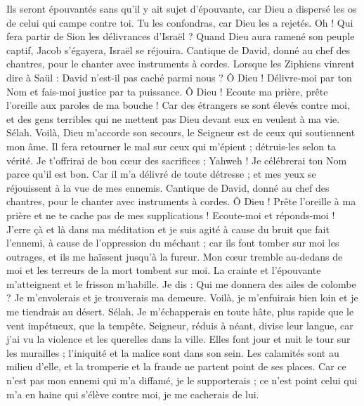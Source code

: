 \begin{multicols}{2}
Ils seront épouvantés sans qu'il y ait sujet d'épouvante, car Dieu a dispersé les os de celui qui campe contre toi. Tu les confondras, car Dieu les a rejetés.
Oh ! Qui fera partir de Sion les délivrances d'Israël ? Quand Dieu aura ramené son peuple captif, Jacob s'égayera, Israël se réjouira.
\VerseOne{}Cantique de David, donné au chef des chantres, pour le chanter avec instruments à cordes.
Lorsque les Ziphiens vinrent dire à Saül : David n'est-il pas caché parmi nous ?
Ô Dieu ! Délivre-moi par ton Nom et fais-moi justice par ta puissance.
Ô Dieu ! Ecoute ma prière, prête l'oreille aux paroles de ma bouche !
Car des étrangers se sont élevés contre moi, et des gens terribles qui ne mettent pas Dieu devant eux en veulent à ma vie. Sélah.
Voilà, Dieu m'accorde son secours, le Seigneur est de ceux qui soutiennent mon âme.
Il fera retourner le mal sur ceux qui m'épient ; détruis-les selon ta vérité.
Je t'offrirai de bon cœur des sacrifices ; Yahweh ! Je célébrerai ton Nom parce qu'il est bon.
Car il m'a délivré de toute détresse ; et mes yeux se réjouissent à la vue de mes ennemis.
\VerseOne{}Cantique de David, donné au chef des chantres, pour le chanter avec instruments à cordes.
Ô Dieu ! Prête l'oreille à ma prière et ne te cache pas de mes supplications !
Ecoute-moi et réponds-moi ! J'erre çà et là dans ma méditation et je suis agité
à cause du bruit que fait l'ennemi, à cause de l'oppression du méchant ; car ils font tomber sur moi les outrages, et ils me haïssent jusqu'à la fureur.
Mon cœur tremble au-dedans de moi et les terreurs de la mort tombent sur moi.
La crainte et l'épouvante m'atteignent et le frisson m'habille.
Je dis : Qui me donnera des ailes de colombe ? Je m'envolerais et je trouverais ma demeure.
Voilà, je m'enfuirais bien loin et je me tiendrais au désert. Sélah.
Je m'échapperais en toute hâte, plus rapide que le vent impétueux, que la tempête.
Seigneur, réduis à néant, divise leur langue, car j'ai vu la violence et les querelles dans la ville.
Elles font jour et nuit le tour sur les murailles ; l'iniquité et la malice sont dans son sein.
Les calamités sont au milieu d'elle, et la tromperie et la fraude ne partent point de ses places.
Car ce n'est pas mon ennemi qui m'a diffamé, je le supporterais ; ce n'est point celui qui m'a en haine qui s'élève contre moi, je me cacherais de lui.

\end{multicols}
